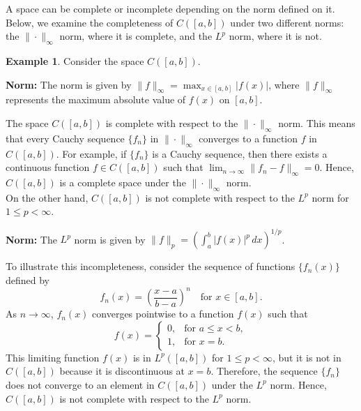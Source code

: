 \documentclass[12pt, reqno]{amsart}
\theoremstyle{definition}
\newtheorem{example}[theorem]{Example}
\numberwithin{equation}{section}
\begin{document}
A space can be complete or incomplete depending on the norm defined on it. Below, we examine the completeness of $C([a, b])$ under two different norms: the $\|\cdot\|_\infty$ norm, where it is complete, and the $L^p$ norm, where it is not.

\begin{example}
Consider the space $C([a, b])$.

\textbf{Norm:} The norm is given by $\|f\|_\infty = \max_{x \in [a, b]} |f(x)|$, where $\|f\|_\infty$ represents the maximum absolute value of $f(x)$ on $[a, b]$.


The space $C([a, b])$ is complete with respect to the $\|\cdot\|_\infty$ norm. This means that every Cauchy sequence $\{f_n\}$ in $\|\cdot\|_\infty$ converges to a function $f$ in $C([a, b])$. For example, if $\{f_n\}$ is a Cauchy sequence, then there exists a continuous function $f \in C([a, b])$ such that $\lim_{n \to \infty} \|f_n - f\|_\infty = 0$. Hence, $C([a, b])$ is a complete space under the $\|\cdot\|_\infty$ norm.\\

On the other hand, $C([a, b])$ is not complete with respect to the $L^p$ norm for $1 \leq p < \infty$.

\textbf{Norm:} The $L^p$ norm is given by $\|f\|_p = \left( \int_a^b |f(x)|^p \, dx \right)^{1/p}$.

To illustrate this incompleteness, consider the sequence of functions $\{f_n(x)\}$ defined by
\[
f_n(x) = \left(\frac{x - a}{b - a}\right)^n \quad \text{for } x \in [a, b].
\]
As $n \to \infty$, $f_n(x)$ converges pointwise to a function $f(x)$ such that
\[
f(x) = 
\begin{cases} 
0, & \text{for } a \leq x < b, \\
1, & \text{for } x = b.
\end{cases}
\]
This limiting function $f(x)$ is in $L^p([a, b])$ for $1 \leq p < \infty$, but it is not in $C([a, b])$ because it is discontinuous at $x = b$. Therefore, the sequence $\{f_n\}$ does not converge to an element in $C([a, b])$ under the $L^p$ norm. Hence, $C([a, b])$ is not complete with respect to the $L^p$ norm.
\end{example}
\end{document}
